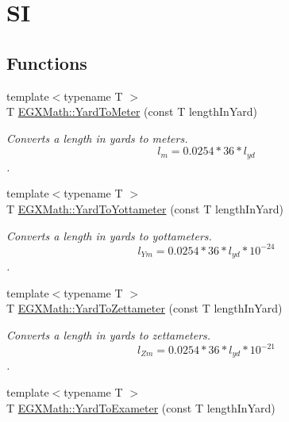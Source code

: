 \hypertarget{group___e_g_x_math-_conversions-_length_conversions-_imperial-_yard-_s_i}{}\section{SI}
\label{group___e_g_x_math-_conversions-_length_conversions-_imperial-_yard-_s_i}
\subsection*{Functions}
\begin{DoxyCompactItemize}
\item 
{\footnotesize template$<$typename T $>$ }\\T \mbox{\hyperlink{group___e_g_x_math-_conversions-_length_conversions-_imperial-_yard-_s_i_gadd64039dca326950457e402fc0695083}{E\+G\+X\+Math\+::\+Yard\+To\+Meter}} (const T length\+In\+Yard)
\begin{DoxyCompactList}\small\item\em Converts a length in yards to meters. \[ l_{m}=0.0254 * 36 * l_{yd} \]. \end{DoxyCompactList}\item 
{\footnotesize template$<$typename T $>$ }\\T \mbox{\hyperlink{group___e_g_x_math-_conversions-_length_conversions-_imperial-_yard-_s_i_ga746a9edfd1cf2828e2fa0d9dfccc22fd}{E\+G\+X\+Math\+::\+Yard\+To\+Yottameter}} (const T length\+In\+Yard)
\begin{DoxyCompactList}\small\item\em Converts a length in yards to yottameters. \[ l_{Ym}=0.0254 * 36 * l_{yd} * 10^{-24} \]. \end{DoxyCompactList}\item 
{\footnotesize template$<$typename T $>$ }\\T \mbox{\hyperlink{group___e_g_x_math-_conversions-_length_conversions-_imperial-_yard-_s_i_gace544729d64e05b9b27c098c659f10d1}{E\+G\+X\+Math\+::\+Yard\+To\+Zettameter}} (const T length\+In\+Yard)
\begin{DoxyCompactList}\small\item\em Converts a length in yards to zettameters. \[ l_{Zm}=0.0254 * 36 * l_{yd} * 10^{-21} \]. \end{DoxyCompactList}\item 
{\footnotesize template$<$typename T $>$ }\\T \mbox{\hyperlink{group___e_g_x_math-_conversions-_length_conversions-_imperial-_yard-_s_i_ga4a7094ebfbac7caa8c6b4eb0f695e57a}{E\+G\+X\+Math\+::\+Yard\+To\+Exameter}} (const T length\+In\+Yard)

\end{DoxyCompactItemize}
